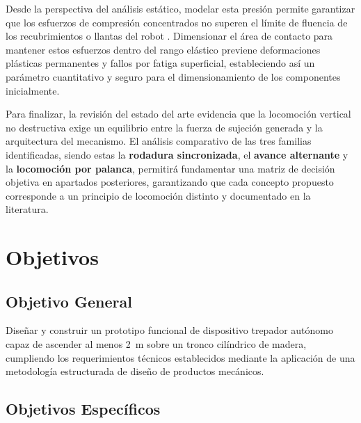 \documentclass[lettersize,journal]{IEEEtran}
\begin{document}
Desde la perspectiva del análisis estático, modelar esta presión permite garantizar que
los esfuerzos de compresión concentrados no superen el límite de fluencia de los
recubrimientos o llantas del robot \cite{Shigley2020}. Dimensionar el área de contacto
para mantener estos esfuerzos dentro del rango elástico previene deformaciones plásticas
permanentes y fallos por fatiga superficial, estableciendo así un parámetro cuantitativo
y seguro para el dimensionamiento de los componentes inicialmente.

Para finalizar, la revisión del estado del arte evidencia que la locomoción vertical no
destructiva exige un equilibrio entre la fuerza de sujeción generada y la arquitectura
del mecanismo. El análisis comparativo de las tres familias identificadas, siendo estas la
\textbf{rodadura sincronizada}, el \textbf{avance alternante} y la \textbf{locomoción por
palanca}, permitirá fundamentar una matriz de decisión objetiva en apartados
posteriores, garantizando que cada concepto propuesto corresponde a un principio de
locomoción distinto y documentado en la literatura.

\section{\textbf{Objetivos}}

\subsection{\textbf{Objetivo General}}

Diseñar y construir un prototipo funcional de dispositivo trepador autónomo capaz de
ascender al menos \SI{2}{\meter} sobre un tronco cilíndrico de madera, cumpliendo los
requerimientos técnicos establecidos mediante la aplicación de una metodología
estructurada de diseño de productos mecánicos.

\subsection{\textbf{Objetivos Específicos}}
\end{document}
